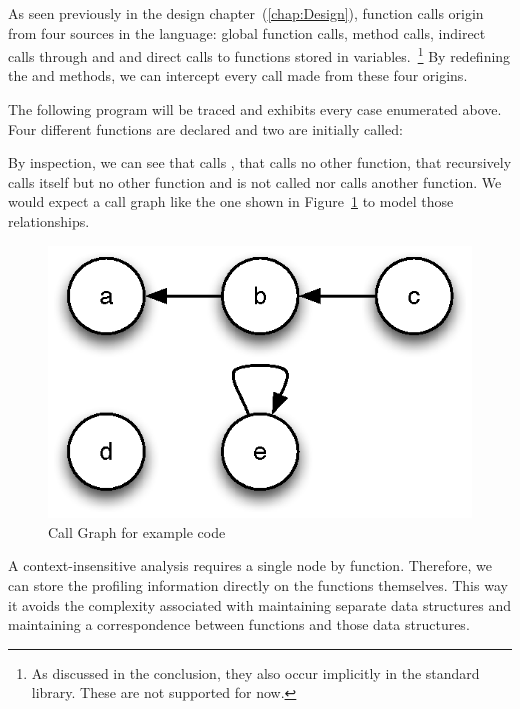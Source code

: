As seen previously in the design chapter~(\ref{chap:Design}), function calls
origin from four sources in the language: global function calls, method calls,
indirect calls through  and  and direct calls to functions
stored in variables.~\footnote{As discussed in the conclusion, they also occur
implicitly in the standard library. These are not supported for now.} By
redefining the  and  methods, we can intercept every call
made from these four origins.

The following program will be traced and exhibits every case enumerated
above. Four different functions are declared and two are initially called:


By inspection, we can see that  calls , that  calls no other
function, that  recursively calls itself but no other function and 
is not called nor calls another function. We would expect a call graph like the
one shown in Figure~\ref{fig:CallGraph} to model those relationships.

\begin{figure}[htb]
\begin{center}
\includegraphics{figures/callgraph}
\caption{\label{fig:CallGraph} Call Graph for example code}
\end{center}
\end{figure}

A context-insensitive analysis requires a single node by function. Therefore,
we can store the profiling information directly on the functions themselves.
This way it avoids the complexity associated with maintaining separate data
structures and maintaining a correspondence between functions and those data
structures.

